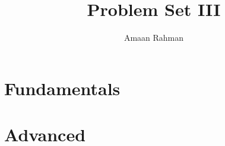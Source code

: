 \documentclass[12pt]{article}
\title{Problem Set III}
\author{Amaan Rahman}
\begin{document}
\maketitle
\section*{Fundamentals}

\section*{Advanced}

\end{document}
